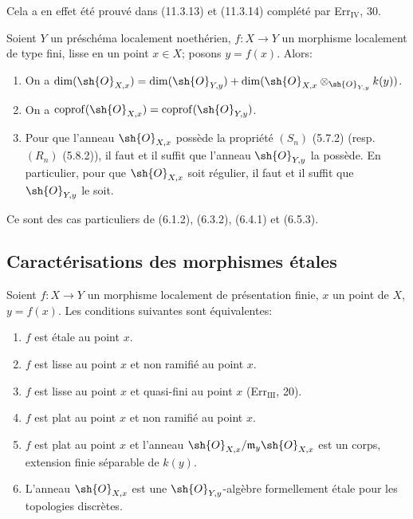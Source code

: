 Cela a en effet été prouvé dans (11.3.13) et (11.3.14) complété par Err$_{\mathrm{IV}}$, 30.

\begin{proposition}[17.5.8]
\label{IV.17.5.8}
Soient $Y$ un préschéma localement noethérien, $f:X\to Y$ un morphisme localement de type fini, lisse en un point $x\in X$; posons $y=f(x)$. Alors:
\begin{enumerate}
  \item[(i)] On a $\dim(\sh{O}_{X,x})=\dim(\sh{O}_{Y,y})+\dim(\sh{O}_{X,x}\otimes_{\sh{O}_{Y,y}}k(y))$.
  \item[(ii)] On a $\operatorname{coprof}(\sh{O}_{X,x})=\operatorname{coprof}(\sh{O}_{Y,y})$.
  \item[(iii)] Pour que l'anneau $\sh{O}_{X,x}$ possède la propriété $(S_n)$ (5.7.2) (resp. $(R_n)$ (5.8.2)), il faut et il suffit que l'anneau $\sh{O}_{Y,y}$ la possède. En particulier, pour que $\sh{O}_{X,x}$ soit régulier, il faut et il suffit que $\sh{O}_{Y,y}$ le soit.
\end{enumerate}
\end{proposition}

Ce sont des cas particuliers de (6.1.2), (6.3.2), (6.4.1) et (6.5.3).

\subsection{Caractérisations des morphismes étales}
\label{subsection:IV.17.6}

\begin{theorem}[17.6.1]
\label{IV.17.6.1}
Soient $f:X\to Y$ un morphisme localement de présentation finie, $x$ un point de $X$, $y=f(x)$. Les conditions suivantes sont équivalentes:
\begin{enumerate}
  \item[a)] $f$ est étale au point $x$.
  \item[a')] $f$ est lisse au point $x$ et non ramifié au point $x$.
  \item[b)] $f$ est lisse au point $x$ et quasi-fini au point $x$ (Err$_{\mathrm{III}}$, 20).
  \item[c)] $f$ est plat au point $x$ et non ramifié au point $x$.
  \item[c')] $f$ est plat au point $x$ et l'anneau $\sh{O}_{X,x}/\mathfrak m_y\sh{O}_{X,x}$ est un corps, extension finie séparable de $k(y)$.
  \item[d)] L'anneau $\sh{O}_{X,x}$ est une $\sh{O}_{Y,y}$-algèbre formellement étale pour les topologies discrètes.
\end{enumerate}
\end{theorem}

